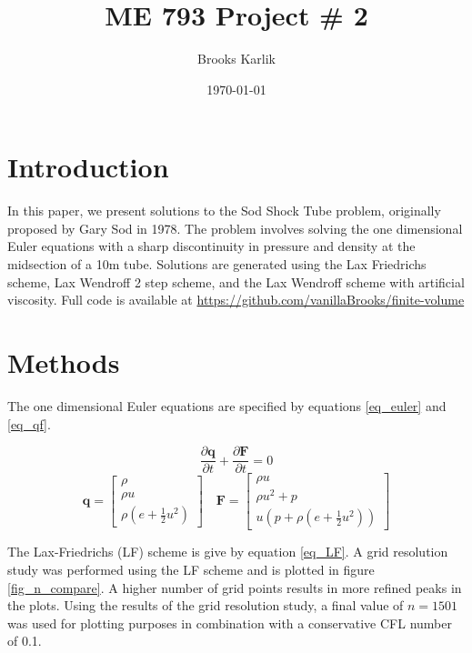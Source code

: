 \documentclass{article}
\title{ME 793 Project \# 2}
\author{Brooks Karlik}
\date{\today}
\begin{document}
\maketitle
\newpage

\section{Introduction}

In this paper, we present solutions to the Sod Shock Tube problem, originally proposed by Gary
Sod in 1978. The problem involves solving the one dimensional Euler equations with a sharp
discontinuity in pressure and density at the midsection of a 10m tube. 
Solutions are generated using the Lax Friedrichs scheme, Lax Wendroff 2 step 
scheme, and the Lax Wendroff scheme with artificial viscosity. Full code is available 
at \url{https://github.com/vanillaBrooks/finite-volume}

\section{Methods}

The one dimensional Euler equations are specified by equations \ref{eq_euler} and \ref{eq_qf}.

\begin{equation}
	\frac{
		\partial \boldsymbol{q}
	}{
		\partial t
	}
	+
	\frac{
		\partial \boldsymbol{F}
	}{
		\partial t
	}
	=
	0
	\label{eq_euler}
\end{equation}
\begin{equation}
	\boldsymbol{q}
	=
	\begin{bmatrix}
		\rho \\
		\rho u \\
		\rho \left(e + \frac{1}{2} u^2\right)
	\end{bmatrix}
	\quad
	\boldsymbol{F}
	=
	\begin{bmatrix}
		\rho u \\
		\rho u^2 + p \\
		u 
		\left(
			p + \rho
			\left(
				e + \frac{1}{2} u^2
			\right)
		\right)
	\end{bmatrix}
	\label{eq_qf}
\end{equation}

The Lax-Friedrichs (LF) scheme is give by equation \ref{eq_LF}. A grid resolution study was performed using
the LF scheme and is plotted in figure \ref{fig_n_compare}. A higher number of grid points results
in more refined peaks in the plots.
Using the results of the grid resolution study, a 
final value of $n=1501$ was used for plotting purposes in combination with a conservative CFL number of 0.1.
\end{document}

